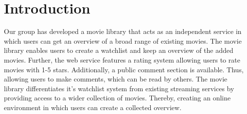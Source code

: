 \section{Introduction}

Our group has developed a movie library that acts as an independent service in which users can get an overview of a broad range of existing movies. The movie library enables users to create a watchlist and keep an overview of the added movies. Further, the web service features a rating system allowing users to rate movies with 1-5 stars. Additionally, a public comment section is available. Thus, allowing users to make comments, which can be read by others.\newline
The movie library differentiates it's watchlist system from existing streaming services by providing access to a wider collection of movies. Thereby, creating an online environment in which users can create a collected overview. \newline
